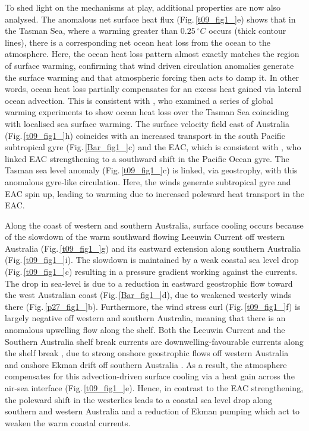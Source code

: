 \documentclass[draft,linenumbers]{agujournal2018}
\begin{document}
To shed light on the mechanisms at play, additional properties are now also analysed. The anomalous net surface heat flux (Fig.\,\ref{t09_fig1_}e) shows that in the Tasman Sea, where a warming greater than $0.25\ ^{\circ}C$ occurs (thick contour lines), there is a corresponding net ocean heat loss from the ocean to the atmosphere. Here, the ocean heat loss pattern almost exactly matches the region of surface warming, confirming that wind driven circulation anomalies generate the surface warming and that atmospheric forcing then acts to damp it. In other words, ocean heat loss partially compensates for an excess heat gained via lateral ocean advection. This is consistent with \citet{Cai2005}, who examined a series of global warming experiments to show ocean heat loss over the Tasman Sea coinciding with localised sea surface warming. The surface velocity field east of Australia (Fig.\,\ref{t09_fig1_}h) coincides with an increased transport in the south Pacific subtropical gyre (Fig.\,\ref{Bar_fig1_}c) and the EAC, which is consistent with \citet{Hill2011}, who linked EAC strengthening to a southward shift in the Pacific Ocean gyre. The Tasman sea level anomaly (Fig.\,\ref{t09_fig1_}c) is linked, via geostrophy, with this anomalous gyre-like circulation. Here, the winds generate subtropical gyre and EAC spin up, leading to warming due to increased poleward heat transport in the EAC.

Along the coast of western and southern Australia, surface cooling occurs because of the slowdown of the warm southward flowing Leeuwin Current off western Australia (Fig.\,\ref{t09_fig1_}g) and its eastward extension along southern Australia (Fig.\,\ref{t09_fig1_}i). The slowdown is maintained by a weak coastal sea level drop (Fig.\,\ref{t09_fig1_}c) resulting in a pressure gradient working against the currents. The drop in sea-level is due to a reduction in eastward geostrophic flow toward the west Australian coast (Fig.\,\ref{Bar_fig1_}d), due to weakened westerly winds there (Fig.\,\ref{p27_fig1_}b). Furthermore, the wind stress curl (Fig.\,\ref{t09_fig1_}f) is largely negative off western and southern Australia, meaning that there is an anomalous upwelling flow along the shelf. Both the Leeuwin Current and the Southern Australia shelf break currents are downwelling-favourable currents along the shelf break \citep{Furue2017,Middleton2007}, due to strong onshore geostrophic flows off western Australia \citep{Godfrey1985} and onshore Ekman drift off southern Australia \citep{Middleton2007}. As a result, the atmosphere compensates for this advection-driven surface cooling via a heat gain across the air-sea interface (Fig.\,\ref{t09_fig1_}e). Hence, in contrast to the EAC strengthening, the poleward shift in the westerlies leads to a coastal sea level drop along southern and western Australia and a reduction of Ekman pumping which act to weaken the warm coastal currents.
\end{document}
